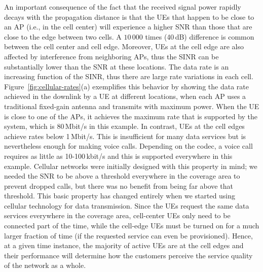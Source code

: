 An important consequence of the fact that the received signal power rapidly decays with the propagation distance is that the \glspl{UE} that happen to be close to an \gls{AP} (i.e., in the cell center) will experience a higher \gls{SNR} than those that are close to the edge between two cells. A $10\,000$ times (40\,dB) difference is common between the cell center and cell edge. Moreover, \glspl{UE} at the cell edge are also affected by interference from neighboring \glspl{AP}, thus the \gls{SINR} can be substantially lower than the \gls{SNR} at these locations. The data rate is an increasing function of the \gls{SINR}, thus there are large rate variations in each cell. Figure~\ref{fig:cellular-rates}(a) exemplifies this behavior by showing the data rate achieved in the downlink by a \gls{UE} at different locations, when each \gls{AP} uses a traditional fixed-gain antenna and transmits with maximum power. When the \gls{UE} is close to one of the \glspl{AP}, it achieves the maximum rate that is supported by the system, which is 80\,Mbit/s in this example. In contrast, \glspl{UE} at the cell edges achieve rates below 1\,Mbit/s. This is insufficient for many data services but is nevertheless enough for making voice calls. Depending on the codec, a voice call requires as little as 10-100\,kbit/s and this is supported everywhere in this example.
Cellular networks were initially designed with this property in mind; we needed the \gls{SNR} to be above a threshold everywhere in the coverage area to prevent dropped calls, but there was no benefit from being far above that threshold. This basic property has  changed entirely when we started using cellular technology for data transmission.
Since the \glspl{UE} request the same data services everywhere in the coverage area, cell-center \glspl{UE} only need to be connected part of the time, while the cell-edge \glspl{UE} must be turned on for a much larger fraction of time (if the requested service can even be provisioned). Hence, at a given time instance, the majority of active \glspl{UE} are at the cell edges and their performance will determine how the customers perceive the service quality of the network as a whole.

